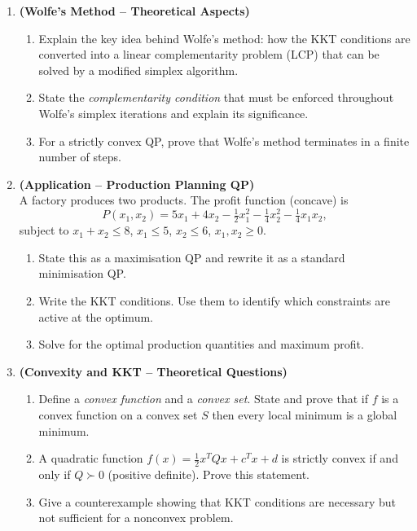 \documentclass[12pt,a4paper]{article}
\begin{document}
\begin{enumerate}[leftmargin=*, label=\textbf{Q.\arabic*.}]
\item \textbf{(Wolfe's Method -- Theoretical Aspects)}\\
  \begin{enumerate}[label=(\alph*)]
    \item Explain the key idea behind Wolfe's method: how the KKT conditions
          are converted into a linear complementarity problem (LCP) that can
          be solved by a modified simplex algorithm.
    \item State the \textit{complementarity condition} that must be enforced
          throughout Wolfe's simplex iterations and explain its significance.
    \item For a strictly convex QP, prove that Wolfe's method terminates in a
          finite number of steps.
  \end{enumerate}

\item \textbf{(Application -- Production Planning QP)}\\
  A factory produces two products.  The profit function (concave) is
  \[
    P(x_1, x_2) = 5x_1 + 4x_2 - \tfrac{1}{2}x_1^2 - \tfrac{1}{4}x_2^2
                  - \tfrac{1}{4}x_1 x_2,
  \]
  subject to $x_1 + x_2 \le 8$, $x_1 \le 5$, $x_2 \le 6$, $x_1, x_2 \ge 0$.
  \begin{enumerate}[label=(\alph*)]
    \item State this as a maximisation QP and rewrite it as a standard
          minimisation QP.
    \item Write the KKT conditions.  Use them to identify which constraints
          are active at the optimum.
    \item Solve for the optimal production quantities and maximum profit.
  \end{enumerate}

\item \textbf{(Convexity and KKT -- Theoretical Questions)}\\
  \begin{enumerate}[label=(\alph*)]
    \item Define a \textit{convex function} and a \textit{convex set}.  State
          and prove that if $f$ is a convex function on a convex set $S$ then
          every local minimum is a global minimum.
    \item A quadratic function $f(x) = \tfrac{1}{2} x^T Q x + c^T x + d$
          is strictly convex if and only if $Q \succ 0$ (positive definite).
          Prove this statement.
    \item Give a counterexample showing that KKT conditions are necessary but
          not sufficient for a nonconvex problem.
  \end{enumerate}


\end{enumerate}
\end{document}
